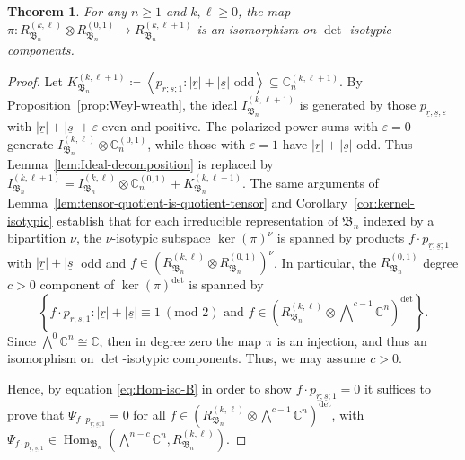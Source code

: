 \documentclass[11pt, reqno]{amsart}
\newtheorem{theorem}{Theorem}[section]
\theoremstyle{definition}
\theoremstyle{remark}
\numberwithin{equation}{section}
\newcommand{\0}{\emptyset}
\newcommand{\C}{\mathbb{C}}
\renewcommand{\r}{\underline{r}}
\newcommand{\s}{\underline{s}}
\DeclareMathOperator{\Hom}{Hom}
\begin{document}
\begin{theorem}\label{thm:iso-det}
    For any $n\geq 1$ and $k, \ell \geq 0$, the  map $\pi: R_{\mathfrak{B}_n}^{(k,\ell)} \otimes R_{\mathfrak{B}_n}^{(0,1)} \to R_{\mathfrak{B}_n}^{(k,\ell+1)}$ is an isomorphism on $\det$-isotypic components. 
\end{theorem}

\begin{proof}
    Let $K_{\mathfrak{B}_n}^{(k,\ell+1)} \coloneqq \left\langle p_{\r;\s;1} : |\r| + |\s| \text{ odd}\right\rangle \subseteq \C_n^{(k,\ell+1)}$. By Proposition~\ref{prop:Weyl-wreath}, the ideal $I_{\mathfrak{B}_n}^{(k,\ell+1)}$ is generated by those $p_{\r;\s;\varepsilon}$ with $|\r| + |\s| + \varepsilon$ even and positive. The polarized power sums with $\varepsilon = 0$ generate $I_{\mathfrak{B}_n}^{(k,\ell)} \otimes \C_n^{(0,1)}$, while those with $\varepsilon = 1$ have $|\r| + |\s|$ odd. 
    Thus Lemma~\ref{lem:Ideal-decomposition} is replaced by $I_{\mathfrak{B}_n}^{(k,\ell+1)} = I_{\mathfrak{B}_n}^{(k,\ell)} \otimes \C_n^{(0,1)} + K_{\mathfrak{B}_n}^{(k,\ell+1)}$.
    The same arguments of Lemma~\ref{lem:tensor-quotient-is-quotient-tensor} and Corollary~\ref{cor:kernel-isotypic} establish that for each irreducible representation of $\mathfrak{B}_n$ indexed by a bipartition $\nu$, 
    the $\nu$-isotypic subspace $\ker(\pi)^\nu$ is spanned by products $f \cdot p_{\r;\s;1}$ with $|\r| + |\s|$ odd and $f \in \left(R_{\mathfrak{B}_n}^{(k,\ell)} \otimes R_{\mathfrak{B}_n}^{(0,1)}\right)^\nu$. In particular, the $R_{\mathfrak{B}_n}^{(0,1)}$ degree $c>0$ component of $\ker(\pi)^{\det}$ is spanned by
    \[
\left\{ f \cdot p_{\r;\s;1} : |\r| + |\s| \equiv 1 \ (\text{mod } 2) \text{ and } f \in \left(R_{\mathfrak{B}_n}^{(k,\ell)} \otimes \bigwedge\nolimits^{c-1}\C^n\right)^{\det}\right\}.
    \]
Since $\bigwedge\nolimits^0 \C^n \cong \C$, then in degree zero the map $\pi$ is an injection, and thus an isomorphism on $\det$-isotypic components. Thus, we may assume $c>0$. 
    
Hence, by equation \eqref{eq:Hom-iso-B} in order to show $f \cdot p_{\r;\s;1} =0$ it suffices to prove that $\Psi_{f \cdot p_{\r;\s;1}} =0$ for all $ f \in \left(R_{\mathfrak{B}_n}^{(k,\ell)} \otimes \bigwedge\nolimits^{c-1}\C^n\right)^{\det}$, with $\Psi_{f \cdot p_{\r;\s;1}} \in \Hom_{\mathfrak{B}_n} \left(\bigwedge\nolimits^{n-c} \C^n, R_{\mathfrak{B}_n}^{(k,\ell)}\right)$.


\end{proof}
\end{document}

